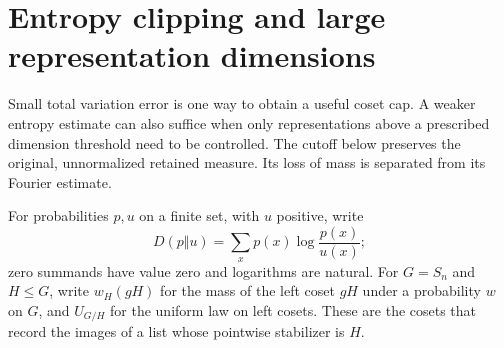 \section{Entropy clipping and large representation dimensions}
\label{l:replica-section}

Small total variation error is one way to obtain a useful coset cap.
A weaker entropy estimate can also suffice when only representations
above a prescribed dimension threshold need to be controlled.  The
cutoff below preserves the original, unnormalized retained measure.
Its loss of mass is separated from its Fourier estimate.

For probabilities $p,u$ on a finite set, with $u$ positive, write
\[
 D(p\Vert u)=\sum_xp(x)\log\frac{p(x)}{u(x)};
\]
zero summands have value zero and logarithms are natural.
For $G=S_n$ and $H\le G$, write $w_H(gH)$ for the mass of the
left coset $gH$ under a probability $w$ on $G$, and $U_{G/H}$ for
the uniform law on left cosets.  These are the cosets that record the
images of a list whose pointwise stabilizer is $H$.

